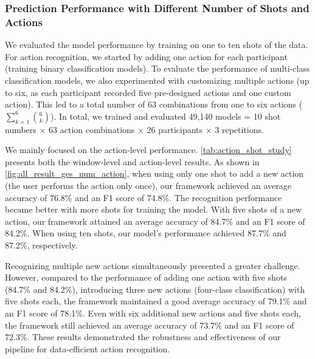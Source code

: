 \subsubsection{Prediction Performance with Different Number of Shots and Actions}
\label{subsub:model_evaluation:pipeline_evaluation:shots and action}
We evaluated the model performance by training on one to ten shots of the data.
For action recognition, we started by adding one action for each participant (\ie training binary classification models).
To evaluate the performance of multi-class classification models, we also experimented with customizing multiple actions (up to six, as each participant recorded five pre-designed actions and one custom action). This led to a total number of 63 combinations from one to six actions (\(\sum_{k=1}^6 \binom{6}{k}\)).
In total, we trained and evaluated 49,140 models = 10 shot numbers $\times$ 63 action combinations $\times$ 26 participants $\times$ 3 repetitions. 

We mainly focused on the action-level performance. \autoref{tab:action_shot_study} presents both the window-level and action-level results.
As shown in \autoref{fig:all_result_ges_num_action}, when using only one shot to add a new action (\ie the user performs the action only once), our framework achieved an average accuracy of 76.8\% and an F1 score of 74.8\%.
The recognition performance became better with more shots for training the model. With five shots of a new action, our framework attained an average accuracy of 84.7\% and an F1 score of 84.2\%. When using ten shots, our model's performance achieved 87.7\% and 87.2\%, respectively.

Recognizing multiple new actions simultaneously presented a greater challenge. However, compared to the performance of adding one action with five shots (84.7\% and 84.2\%), introducing three new actions (\ie four-class classification) with five shots each, the framework maintained a good average accuracy of 79.1\% and an F1 score of 78.1\%.
Even with six additional new actions and five shots each, the framework still achieved an average accuracy of 73.7\% and an F1 score of 72.3\%.
These results demonstrated the robustness and effectiveness of our pipeline for data-efficient action recognition.

